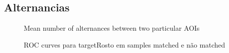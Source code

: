 \documentclass{article}
\begin{document}
\subsection{Alternancias}

\begin{figure}[H]
  \caption{Mean number of alternances between two particular AOIs}
  \noindent{}
  \centering
\end{figure}

\begin{figure}[H]
  \caption{ROC curves para targetRosto em samples matched e não matched}
  \noindent{}
  \centering
\end{figure}
\end{document}
